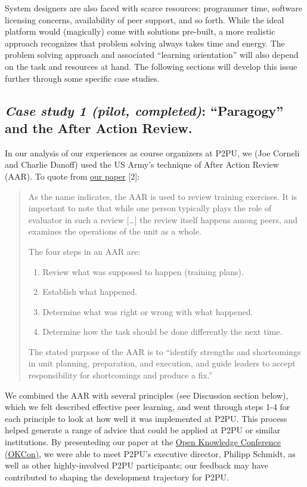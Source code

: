 System designers are also faced with scarce resources: programmer time,
software licensing concerns, availability of peer support, and so forth.
While the ideal platform would (magically) come with solutions
pre-built, a more realistic approach recognizes that problem solving
always takes time and energy. The problem solving approach and
associated ``learning orientation'' will also depend on the task and
resources at hand. The following sections will develop this issue
further through some specific case studies.

\subsection{\emph{Case study 1 (pilot, completed)}: ``Paragogy'' and the
After Action Review.}

In our analysis of our experiences as course organizers at P2PU, we (Joe
Corneli and Charlie Danoff) used the US Army's technique of After Action
Review (AAR). To quote from
\href{http://paragogy.net/ParagogyPaper2}{our paper} {[}2{]}:

\begin{quote}
As the name indicates, the AAR is used to review training exercises. It
is important to note that while one person typically plays the role of
evaluator in such a review {[}\ldots{}{]} the review itself happens
among peers, and examines the operations of the unit as a whole.

The four steps in an AAR are:

\begin{enumerate}
\item
  Review what was supposed to happen (training plans).
\item
  Establish what happened.
\item
  Determine what was right or wrong with what happened.
\item
  Determine how the task should be done differently the next time.
\end{enumerate}
The stated purpose of the AAR is to ``identify strengths and
shortcomings in unit planning, preparation, and execution, and guide
leaders to accept responsibility for shortcomings and produce a fix.''

\end{quote}
We combined the AAR with several principles (see Discussion section
below), which we felt described effective peer learning, and went
through steps 1-4 for each principle to look at how well it was
implemented at P2PU. This process helped generate a range of advice that
could be applied at P2PU or similar institutions. By presenteding our
paper at the \href{http://okfn.org/okcon/}{Open Knowledge Conference
(OKCon)}, we were able to meet P2PU's executive director, Philipp
Schmidt, as well as other highly-involved P2PU participants; our
feedback may have contributed to shaping the development trajectory for
P2PU.

